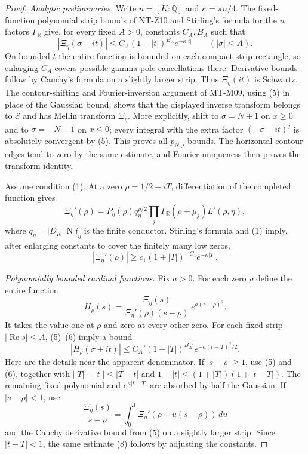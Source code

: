 \begin{proof}
\emph{Analytic preliminaries.}
Write $n=[K:\mathbb Q]$ and $\kappa=\pi n/4$.
The fixed-function polynomial strip bounds of NT-Z10 and
Stirling's formula for the $n$ factors $\Gamma_{\mathbb R}$
give, for every fixed $A>0$, constants $C_A,B_A$ such that
\[
 |\Xi_\eta(\sigma+it)|
       \le C_A(1+|t|)^{B_A}e^{-\kappa|t|}
                            \qquad(|\sigma|\le A).     \tag{5}
\]
On bounded $t$ the entire function is bounded on each compact
strip rectangle, so enlarging $C_A$ covers possible gamma-pole
cancellations there. Derivative bounds follow by Cauchy's formula
on a slightly larger strip. Thus $\Xi_\eta(it)$ is Schwartz.
The contour-shifting and Fourier-inversion argument of MT-M09,
using (5) in place of the Gaussian bound, shows that the displayed
inverse transform belongs to $\mathcal E$ and has Mellin transform
$\Xi_\eta$. More explicitly, shift to $\sigma=N+1$ on $x\ge0$
and to $\sigma=-N-1$ on $x\le0$; every integral with the extra
factor $(-\sigma-it)^j$ is absolutely convergent by (5).
This proves all $p_{N,j}$ bounds. The horizontal contour edges
tend to zero by the same estimate, and Fourier uniqueness then
proves the transform identity.

Assume condition (1). At a zero $\rho=1/2+iT$, differentiation
of the completed function gives
\[
 \Xi_\eta'(\rho)
  =P_\eta(\rho)q_\eta^{\rho/2}
       \prod_j\Gamma_{\mathbb R}(\rho+\mu_j)L'(\rho,\eta),
\]
where $q_\eta=|D_K|\operatorname N\mathfrak f_\eta$
is the finite conductor.
Stirling's formula and (1) imply, after enlarging constants to
cover the finitely many low zeros,
\[
        |\Xi_\eta'(\rho)|
           \ge c_1(1+|T|)^{-C_1}e^{-\kappa|T|}.         \tag{6}
\]

\emph{Polynomially bounded cardinal functions.}
Fix $a>0$. For each zero $\rho$ define the entire function
\[
 H_\rho(s)=
     \frac{\Xi_\eta(s)}
          {\Xi_\eta'(\rho)(s-\rho)}\,e^{a(s-\rho)^2}.    \tag{7}
\]
It takes the value one at $\rho$ and zero at every other zero.
For each fixed strip $|\operatorname{Re}s|\le A$, (5)--(6)
imply a bound
\[
 |H_\rho(\sigma+it)|
       \le C_A'(1+|T|)^{B_A'}
                              e^{-a(t-T)^2/2}.         \tag{8}
\]
Here are the details near the apparent denominator. If
$|s-\rho|\ge1$, use (5) and (6), together with
$\big||T|-|t|\big|\le|T-t|$ and
$1+|t|\le(1+|T|)(1+|t-T|)$.
The remaining fixed polynomial and
$e^{\kappa|t-T|}$ are absorbed by half the Gaussian.
If $|s-\rho|<1$, use
\[
 \frac{\Xi_\eta(s)}{s-\rho}
       =\int_0^1\Xi_\eta'(\rho+u(s-\rho))\,du
\]
and the Cauchy derivative bound from (5) on a slightly larger
strip. Since $|t-T|<1$, the same estimate (8) follows by
adjusting the constants.


\end{proof}
